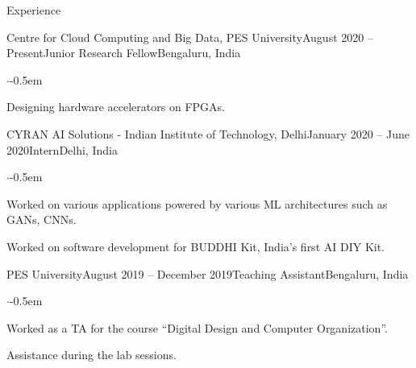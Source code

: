 \documentclass{CV} %
\begin{document}




\begin{rSection}{Experience}
  \begin{rSubsection}{Centre for Cloud Computing and Big Data, PES University}{August 2020 -- Present}{Junior Research Fellow}{Bengaluru, India}
    \begin{list}{$\cdot$}{\footnotesize}\itemsep -0.5em \vspace{-0.5em}
      \item Designing hardware accelerators on FPGAs.
    \end{list}
  \end{rSubsection}
  
  \begin{rSubsection}{CYRAN AI Solutions - Indian Institute of Technology, Delhi}{January 2020 -- June 2020}{Intern}{Delhi, India}
    \begin{list}{$\cdot$}{\footnotesize}\itemsep -0.5em \vspace{-0.5em}
      \item Worked on various applications powered by various ML architectures such as GANs, CNNs.
      \item Worked on software development for BUDDHI Kit, India’s first AI DIY Kit.
    \end{list}
  \end{rSubsection}

  \begin{rSubsection}{PES University}{August 2019 -- December 2019}{Teaching Assistant}{Bengaluru, India}
    \begin{list}{$\cdot$}{\footnotesize}\itemsep -0.5em \vspace{-0.5em}
      \item Worked as a TA for the course ``Digital Design and Computer Organization''.
      \item Assistance during the lab sessions.
    \end{list}
  \end{rSubsection}


\end{rSection}
\end{document}
